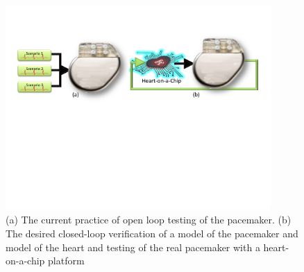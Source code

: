 \begin{figure}[b]
		\centering
		\includegraphics[width=0.9\textwidth]{figs/closedloop.pdf}
		\caption{\small (a) The current practice of open loop testing of the pacemaker. (b) The desired closed-loop verification of a model of the pacemaker and model of the heart and testing of the real pacemaker with a heart-on-a-chip platform}
		\label{fig:closedloop}
\end{figure}


